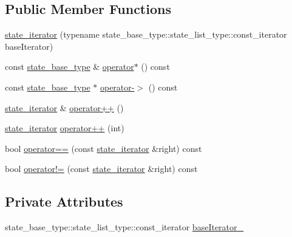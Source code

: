 \subsection*{Public Member Functions}
\begin{DoxyCompactItemize}
\item 
\mbox{\hyperlink{classboost_1_1statechart_1_1state__machine_1_1state__iterator_abf22b7dd6bc3662b86f80ead66e15eab}{state\+\_\+iterator}} (typename state\+\_\+base\+\_\+type\+::state\+\_\+list\+\_\+type\+::const\+\_\+iterator base\+Iterator)
\item 
const \mbox{\hyperlink{classboost_1_1statechart_1_1state__machine_a69cc258c29fcabec25c5dc8bedb7d530}{state\+\_\+base\+\_\+type}} \& \mbox{\hyperlink{classboost_1_1statechart_1_1state__machine_1_1state__iterator_abc910a0812a72f1f26dadc2fe1177a6b}{operator$\ast$}} () const
\item 
const \mbox{\hyperlink{classboost_1_1statechart_1_1state__machine_a69cc258c29fcabec25c5dc8bedb7d530}{state\+\_\+base\+\_\+type}} $\ast$ \mbox{\hyperlink{classboost_1_1statechart_1_1state__machine_1_1state__iterator_a1325f64435cdaf560063aab68eb3ca74}{operator-\/$>$}} () const
\item 
\mbox{\hyperlink{classboost_1_1statechart_1_1state__machine_1_1state__iterator}{state\+\_\+iterator}} \& \mbox{\hyperlink{classboost_1_1statechart_1_1state__machine_1_1state__iterator_ae817393c393e5ef27ab9c99a2419ae79}{operator++}} ()
\item 
\mbox{\hyperlink{classboost_1_1statechart_1_1state__machine_1_1state__iterator}{state\+\_\+iterator}} \mbox{\hyperlink{classboost_1_1statechart_1_1state__machine_1_1state__iterator_a58a5b7610ab60fd7a3b546e6fef29429}{operator++}} (int)
\item 
bool \mbox{\hyperlink{classboost_1_1statechart_1_1state__machine_1_1state__iterator_a63c4c48e6f7e52637c5e6630005c7326}{operator==}} (const \mbox{\hyperlink{classboost_1_1statechart_1_1state__machine_1_1state__iterator}{state\+\_\+iterator}} \&right) const
\item 
bool \mbox{\hyperlink{classboost_1_1statechart_1_1state__machine_1_1state__iterator_a9f4ace7de337c37b2ef23f01f358790b}{operator!=}} (const \mbox{\hyperlink{classboost_1_1statechart_1_1state__machine_1_1state__iterator}{state\+\_\+iterator}} \&right) const
\end{DoxyCompactItemize}
\subsection*{Private Attributes}
\begin{DoxyCompactItemize}
\item 
state\+\_\+base\+\_\+type\+::state\+\_\+list\+\_\+type\+::const\+\_\+iterator \mbox{\hyperlink{classboost_1_1statechart_1_1state__machine_1_1state__iterator_a96e8b4cbbc04c007795d4b4113d63e4c}{base\+Iterator\+\_\+}}
\end{DoxyCompactItemize}


